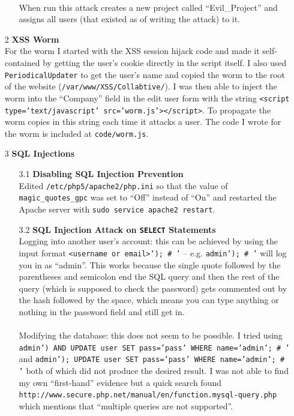 \documentclass[11pt, letterpaper]{article}
\newcommand{\code}[1]{\texttt{#1}}
\begin{document}
\begin{itemize}
\begin{itemize}
       \\When run this attack creates a new project called ``Evil\_Project'' and assigns all users (that existed as of writing the attack) to it.
       \end{itemize}
       \bigskip
    \item[2 ]\textbf{XSS Worm}\\
        For the worm I started with the XSS session hijack code and made it self-contained by getting the user's cookie directly in the script itself. I also used \code{PeriodicalUpdater} to get the user's name and copied the worm to the root of the website (\code{/var/www/XSS/Collabtive/}). I was then able to inject the worm into the ``Company'' field in the edit user form with the string \code{<script type='text/javascript' src='worm.js'></script>}. To propagate the worm copies in this string each time it attacks a user. The code I wrote for the worm is included at \code{code/worm.js}.
        \bigskip
    \item[3 ]\textbf{SQL Injections}
        \begin{itemize}
            \item[3.1 ]\textbf{Disabling SQL Injection Prevention}\\
                Edited \code{/etc/php5/apache2/php.ini} so that the value of \code{magic\_quotes\_gpc} was set to ``Off'' instead of ``On'' and restarted the Apache server with \code{sudo service apache2 restart}.
            \item[3.2 ]\textbf{SQL Injection Attack on \code{SELECT} Statements}\\
                Logging into another user's account: this can be achieved by using the input format \code{<username or email>'); \# '} -- e.g. \code{admin'); \# '} will log you in as ``admin''. This works because the single quote followed by the parentheses and semicolon end the SQL query and then the rest of the query (which is supposed to check the password) gets commented out by the hash followed by the space, which means you can type anything or nothing in the password field and still get in.\\
                \\Modifying the database: this does not seem to be possible. I tried using \code{admin') AND UPDATE user SET pass='pass' WHERE name='admin'; \# '} and \code{admin'); UPDATE user SET pass='pass' WHERE name='admin'; \# '} both of which did not produce the desired result. I was not able to find my own ``first-hand'' evidence but a quick search found \\\code{http://www.secure.php.net/manual/en/function.mysql-query.php}\\which mentions that ``multiple queries are not supported''.

\end{itemize}
\end{itemize}
\end{document}
